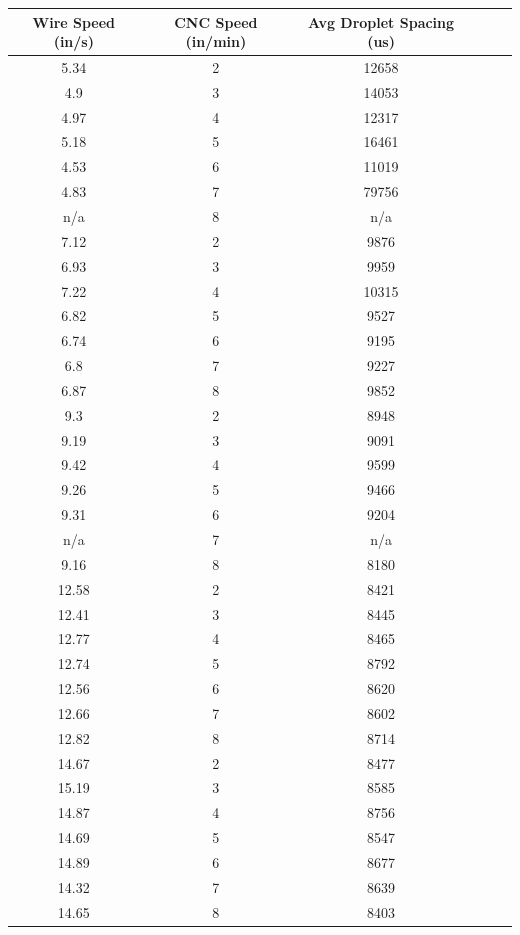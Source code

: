\documentclass[12pt]{article}
\begin{document}
\begin{center}
\begin{tabular}{ |c|c|c|c|c|c| }
  
\end{tabular}


\end{center}

\clearpage



\begin{center}

\begin{tabular}{ |c|c|c|c|c|c| }


  \hline
  \textbf{Wire Speed (in/s)} & \textbf{CNC Speed (in/min)} & \textbf{Avg Droplet Spacing (us)} \\ \hline
5.34 &	2 &	12658 \\ \hline
4.9	& 3 &	14053 \\ \hline
4.97 &	4 &	12317 \\ \hline
5.18 &	5 &	16461 \\ \hline
4.53 &	6 &	11019 \\ \hline
4.83 &	7 &	79756 \\ \hline
n/a &	8 &	n/a \\ \hline \hline
7.12 &	2 &	9876 \\ \hline
6.93 &	3 &	9959 \\ \hline
7.22 &	4 &	10315 \\ \hline
6.82 &	5 &	9527 \\ \hline
6.74 &	6 &	9195 \\ \hline
6.8 &	7 &	9227 \\ \hline
6.87 &	8 &	9852 \\ \hline \hline
9.3 &	2 &	8948 \\ \hline
9.19 &	3 &	9091 \\ \hline
9.42 &	4 &	9599 \\ \hline
9.26 &	5 &	9466 \\ \hline
9.31 &	6 &	9204 \\ \hline
n/a &	7 &	n/a \\ \hline
9.16 &	8 &	8180 \\ \hline \hline
12.58 &	2 &	8421 \\ \hline
12.41 &	3 &	8445 \\ \hline
12.77 &	4 &	8465 \\ \hline
12.74 &	5 &	8792 \\ \hline
12.56 &	6 &	8620 \\ \hline
12.66 &	7 &	8602 \\ \hline
12.82 &	8 &	8714 \\ \hline \hline
14.67 &	2 &	8477 \\ \hline
15.19 &	3 &	8585 \\ \hline
14.87 &	4 &	8756 \\ \hline
14.69 &	5 &	8547 \\ \hline
14.89 &	6 &	8677 \\ \hline
14.32 &	7 &	8639 \\ \hline
14.65 &	8 &	8403 \\ \hline



\end{tabular}
\end{center}
\end{document}
